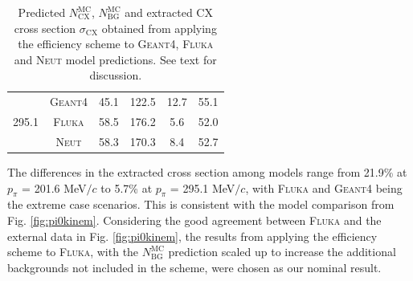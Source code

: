 {\begin{table}[htbp]
\begin{center}
\begin{tabular}{c|c|c|c|c|c}
\multirow{4}{*}{295.1} %
& \textsc{Geant4} & 45.1 & 122.5 & 12.7 & 55.1 \\
& \textsc{Fluka} & 58.5 & 176.2 & 5.6 & 52.0 \\
& \textsc{Neut} & 58.3 & 170.3 & 8.4 & 52.7 \\ \hline
\end{tabular}
\caption{Predicted $N_{\mathrm{CX}}^{\mathrm{MC}}$, $N_{\mathrm{BG}}^{\mathrm{MC}}$ and extracted CX cross section $\sigma_{\mathrm{CX}}$ obtained from applying the efficiency scheme to \textsc{Geant4}, \textsc{Fluka} and \textsc{Neut} model predictions. See text for discussion.}
\label{tbl:eff_scheme_results}
\end{center}
\end{table}

The differences in the extracted cross section among models range from 21.9\% at $p_{\pi}$ = 201.6 MeV$/c$ to 5.7\% at $p_{\pi}$ = 295.1 MeV$/c$, with \textsc{Fluka} and \textsc{Geant4} being the extreme case scenarios. This is consistent with the model comparison from Fig. \ref{fig:pi0kinem}. Considering the good agreement between \textsc{Fluka} and the external data in Fig. \ref{fig:pi0kinem}, the results from applying the efficiency scheme to \textsc{Fluka}, with the $N_{\mathrm{BG}}^{\mathrm{MC}}$ prediction scaled up to increase the additional backgrounds not included in the scheme, were chosen as our nominal result.}